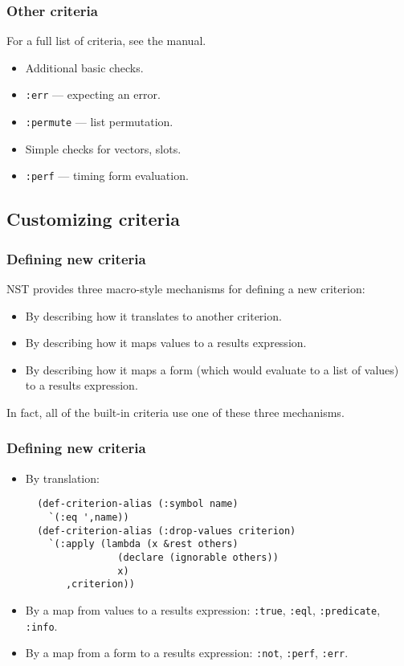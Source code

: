 \documentclass{beamer}
\begin{document}
\begin{frame}[fragile]
  \frametitle{Other criteria}

  For a full list of criteria, see the manual.
  \begin{itemize}
  \item Additional basic checks.
  \item \texttt{:err} --- expecting an error.
  \item \texttt{:permute} --- list permutation.
  \item Simple checks for vectors, slots.
  \item \texttt{:perf} --- timing form evaluation.
  \end{itemize}
\end{frame}

\subsection{Customizing criteria}

\begin{frame}
  \frametitle{Defining new criteria}

  NST provides three macro-style mechanisms for defining a new
  criterion:
  \begin{itemize}
  \item By describing how it translates to another criterion.
  \item By describing how it maps values to a results expression.
  \item By describing how it maps a form (which would evaluate to a
    list of values) to a results expression.
  \end{itemize}
  In fact, all of the built-in criteria use one of these three
  mechanisms.
\end{frame}

\begin{frame}[fragile]
  \frametitle{Defining new criteria}
  \begin{itemize}
  \item By translation:
{\small
\begin{verbatim}
  (def-criterion-alias (:symbol name)
    `(:eq ',name))
  (def-criterion-alias (:drop-values criterion)
    `(:apply (lambda (x &rest others)
                (declare (ignorable others))
                x)
       ,criterion))
\end{verbatim}}
  \item By a map from values to a results expression: \texttt{:true},
    \texttt{:eql}, \texttt{:predicate}, \texttt{:info}.
  \item By a map from a form to a results expression: \texttt{:not},
    \texttt{:perf}, \texttt{:err}.
  \end{itemize}
\end{frame}
\end{document}
